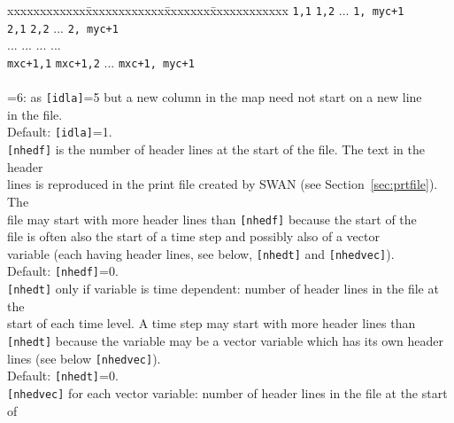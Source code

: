 \documentclass[12pt]{book}
\begin{document}
\begin{tabbing}
                              xxxxxxxxxxxx\=xxxxxxxxxxxx\=xxxxxxx\=xxxxxxxxxxxx \kill
                              {\tt 1,1} \> {\tt 1,2} \> ... \> {\tt 1, myc+1} \\
                              {\tt 2,1} \> {\tt 2,2} \> ... \> {\tt 2, myc+1} \\
                              ...           \> ...           \> ... \> ...              \\
                              {\tt mxc+1,1} \> {\tt mxc+1,2} \> ... \> {\tt mxc+1, myc+1} \\
                              \poptabs
                              \-\\
                       =6: \> as {\tt [idla]}=5 but a new column in the map need not start on a new line\+\\
                              in the file.\-\\
                       \poptabs
                       Default: {\tt [idla]}=1.\-\\
{\tt [nhedf]}       \> is the number of header lines at the start of the file. The text in the header\+\\
                       lines is reproduced in the print file created by SWAN (see Section~\ref{sec:prtfile}). The\\
                       file may start with more header lines than {\tt [nhedf]} because the start of the\\
                       file is often also the start of a time step and possibly also of a vector\\
                       variable (each having header lines, see below, {\tt [nhedt]} and {\tt [nhedvec]}).\\
                       Default: {\tt [nhedf]}=0.\-\\
{\tt [nhedt]}       \> only if variable is time dependent: number of header lines in the file at the\+\\
                       start of each time level. A time step may start with more header lines than\\
                       {\tt [nhedt]} because the variable may be a vector variable which has its own header\\
                       lines (see below {\tt [nhedvec]}).\\
                       Default: {\tt [nhedt]}=0.\-\\
{\tt [nhedvec]}     \> for each vector variable: number of header lines in the file at the start of\+\\

\end{tabbing}
\end{document}
